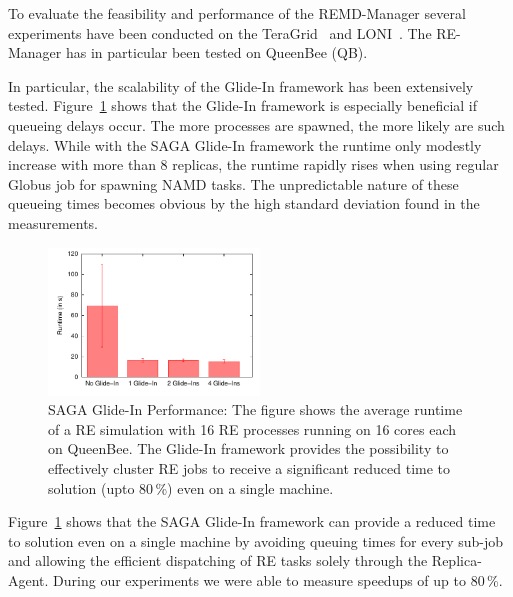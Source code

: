 \documentclass[conference,final]{IEEEtran}
\begin{document}
To evaluate the feasibility and performance of the REMD-Manager
several experiments have been conducted on the
TeraGrid~\cite{teragrid} and LONI~\cite{loni}.  The RE-Manager has in
particular been tested on QueenBee (QB).

In particular, the scalability of the Glide-In framework has been
extensively tested.  Figure~\ref{fig:perf_remd_glidin} shows that the
Glide-In framework is especially beneficial if queueing delays
occur. The more processes are spawned, the more likely are such
delays. While with the SAGA Glide-In framework the runtime only
modestly increase with more than 8 replicas, the runtime rapidly rises
when using regular Globus job for spawning NAMD tasks. The
unpredictable nature of these queueing times becomes obvious by the
high standard deviation found in the measurements.

\begin{figure}[htbp]
        \includegraphics[width=0.5\textwidth]{perf_glidein.pdf}
        \caption{SAGA Glide-In Performance: The figure shows the average runtime of a 
        RE simulation with 16 RE processes running on 16 cores each on QueenBee. 
        The Glide-In framework provides the possibility to effectively cluster
        RE jobs to receive a significant reduced time to solution (upto 80\,\%) 
        even on a single machine.}

    \label{fig:perf_remd_glidin}
\end{figure}

Figure~\ref{fig:perf_remd_glidin} shows that the SAGA Glide-In framework can provide
a reduced time to solution even on a single machine by avoiding queuing times for 
every sub-job and allowing the efficient dispatching of RE tasks solely through the 
Replica-Agent. During our experiments we were able to measure speedups of up to 80\,\%.
\end{document}
